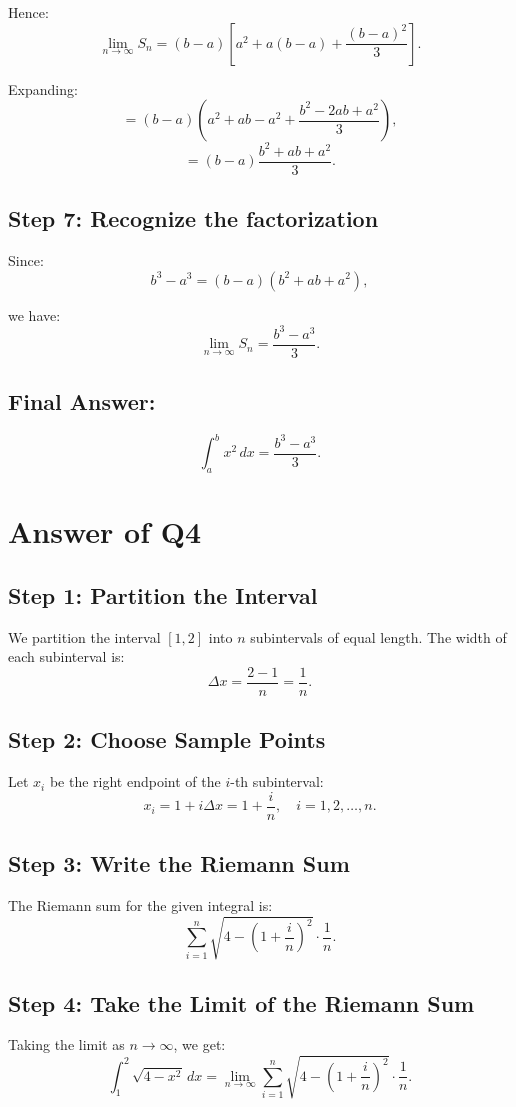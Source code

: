 \documentclass{article}
\begin{document}
Hence:
\[
\lim_{n \to \infty} S_n = (b-a)\left[ a^2 + a(b-a) + \frac{(b-a)^2}{3} \right].
\]

Expanding:
\[
= (b-a)\left( a^2 + ab - a^2 + \frac{b^2 - 2ab + a^2}{3} \right),
\]
\[
= (b-a)\frac{b^2 + ab + a^2}{3}.
\]

\subsection*{Step 7: Recognize the factorization}

Since:
\[
b^3 - a^3 = (b-a)(b^2 + ab + a^2),
\]

we have:
\[
\lim_{n \to \infty} S_n = \frac{b^3 - a^3}{3}.
\]
\subsection*{Final Answer:}
\[
\boxed{\int_a^b x^2 \, dx = \frac{b^3 - a^3}{3}}.
\]

    

\section*{Answer of Q4}

\subsection*{Step 1: Partition the Interval}
We partition the interval \([1, 2]\) into \(n\) subintervals of equal length. The width of each subinterval is:
\[
\Delta x = \frac{2 - 1}{n} = \frac{1}{n}.
\]

\subsection*{Step 2: Choose Sample Points}
Let \(x_i\) be the right endpoint of the \(i\)-th subinterval:
\[
x_i = 1 + i \Delta x = 1 + \frac{i}{n}, \quad i = 1, 2, \ldots, n.
\]

\subsection*{Step 3: Write the Riemann Sum}
The Riemann sum for the given integral is:
\[
\sum_{i=1}^{n} \sqrt{4 - \left(1 + \frac{i}{n}\right)^2} \cdot \frac{1}{n}.
\]

\subsection*{Step 4: Take the Limit of the Riemann Sum}
Taking the limit as \(n \to \infty\), we get:
\[
\int_1^2 \sqrt{4 - x^2} \, dx 
= \lim_{n \to \infty} \sum_{i=1}^{n} \sqrt{4 - \left(1 + \frac{i}{n}\right)^2} \cdot \frac{1}{n}.
\]
\end{document}
